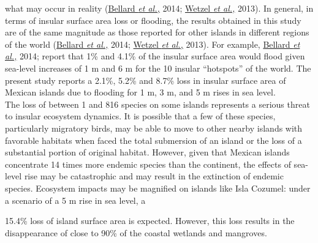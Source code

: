 \documentclass{article} %
\begin{document}
what may occur in reality (\hyperlink{bellard}{Bellard \textit{et al.,}} 2014; \hyperlink{bellard}{Wetzel \textit{et al.,}} 2013). In general,
in terms of insular surface area loss or flooding, the results obtained in this study are
of the same magnitude as those reported for other islands in different regions of the
world (\hyperlink{bellard}{Bellard \textit{et al.,}} 2014; \hyperlink{bellard}{Wetzel \textit{et al.,}} 2013). For example, \hyperlink{bellard}{Bellard \textit{et al.,}} 2014;
report that 1\% and 4.1\% of the insular surface area would flood given sea-level
increases of 1 m and 6 m for the 10 insular “hotspots” of the world. The present
study reports a 2.1\%, 5.2\% and 8.7\% loss in insular surface area of Mexican islands
due to flooding for 1 m, 3 m, and 5 m rises in sea level.\\

The loss of between 1 and 816 species on some islands represents a serious threat
to insular ecosystem dynamics. It is possible that a few of these species, particularly
migratory birds, may be able to move to other nearby islands with favorable habitats
when faced the total submersion of an island or the loss of a substantial portion of
original habitat. However, given that Mexican islands concentrate 14 times more
endemic species than the continent, the effects of sea-level rise may be catastrophic
and may result in the extinction of endemic species. Ecosystem impacts may be
magnified on islands like Isla Cozumel: under a scenario of a 5 m rise in sea level, a

15.4\% loss of island surface area is expected. However, this loss results in the
disappearance of close to 90\% of the coastal wetlands and mangroves.\\
\end{document}
